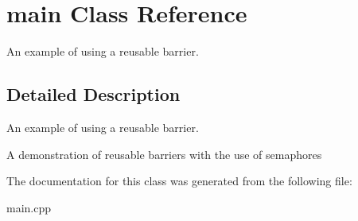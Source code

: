 \hypertarget{classmain}{}\section{main Class Reference}
\label{classmain}


An example of using a reusable barrier.  




\subsection{Detailed Description}
An example of using a reusable barrier. 

A demonstration of reusable barriers with the use of semaphores 

The documentation for this class was generated from the following file\+:\begin{DoxyCompactItemize}
\item 
main.\+cpp\end{DoxyCompactItemize}
